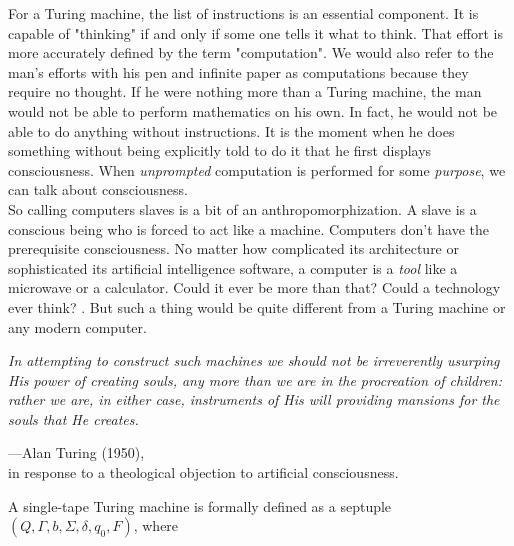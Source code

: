 \begin{tcolorbox}[breakable, enhanced, colback=textbook-blue, sharp corners]
	For a Turing machine, the list of instructions is an essential component. It is capable of "thinking" if and only if some one tells it what to think. That effort is more accurately defined by the term "computation". We would also refer to the man's efforts with his pen and infinite paper as computations because they require no thought. If he were nothing more than a Turing machine, the man would not be able to perform mathematics on his own. In fact, he would not be able to do anything without instructions. It is the moment when he does something without being explicitly told to do it that he first displays consciousness. When \textit{unprompted} computation is performed for some \textit{purpose}, we can talk about consciousness. \\
	
	So calling computers slaves is a bit of an anthropomorphization. A slave is a conscious being who is forced to act like a machine. Computers don't have the prerequisite consciousness. No matter how complicated its architecture or sophisticated its artificial intelligence software, a computer is a \textit{tool} like a microwave or a calculator. Could it ever be more than that? Could a technology ever think? . But such a thing would be quite different from a Turing machine or any modern computer. \\
	
	\parbreak
	\vspace{1mm}
	
	\begin{displayquote}
		\textit{In attempting to construct such machines we should not be irreverently usurping His power of creating souls, any more than we are in the procreation of children: rather we are, in either case, instruments of His will providing mansions for the souls that He creates.}
		\vspace{4mm}
		\begin{flushright}
			---Alan Turing (1950), \\
			in response to a theological objection to artificial consciousness.
		\end{flushright}
	\end{displayquote}
	\vspace{1mm}
\end{tcolorbox}
\vspace{7mm}

A single-tape Turing machine is formally defined as a septuple $(Q,\Gamma,b,\Sigma,\delta,q_0,F)$, where

